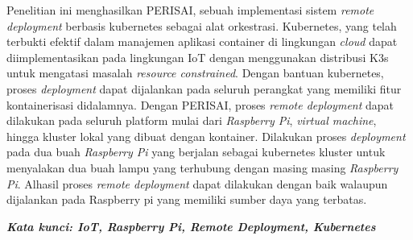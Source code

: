 \begin{singlespace}
  Penelitian ini menghasilkan PERISAI, sebuah implementasi sistem \textit{remote deployment} berbasis kubernetes sebagai alat orkestrasi. Kubernetes, yang telah terbukti efektif dalam manajemen aplikasi container di lingkungan \textit{cloud} dapat diimplementasikan pada lingkungan IoT dengan menggunakan distribusi K3s untuk mengatasi masalah \textit{resource constrained}. Dengan bantuan kubernetes, proses \textit{deployment} dapat dijalankan pada seluruh perangkat yang memiliki fitur kontainerisasi didalamnya. Dengan PERISAI, proses \textit{remote deployment} dapat dilakukan pada seluruh platform mulai dari \textit{Raspberry Pi}, \textit{virtual machine}, hingga kluster lokal yang dibuat dengan kontainer. Dilakukan proses \textit{deployment} pada dua buah \textit{Raspberry Pi} yang berjalan sebagai kubernetes kluster untuk menyalakan dua buah lampu yang terhubung dengan masing masing \textit{Raspberry Pi}. Alhasil proses \textit{remote deployment} dapat dilakukan dengan baik walaupun dijalankan pada Raspberry pi yang memiliki sumber daya yang terbatas.
  
  \textbf{\textit{Kata kunci: IoT, Raspberry Pi, Remote Deployment, Kubernetes }}
  
\end{singlespace}
\clearpage
